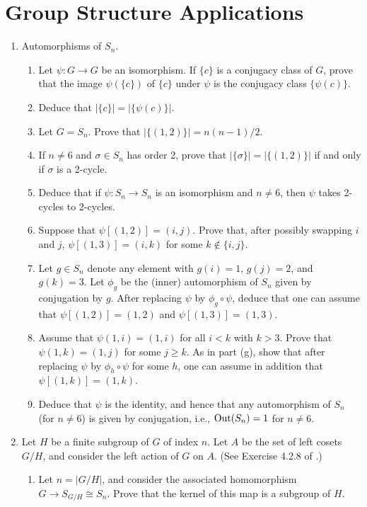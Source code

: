 \documentclass[../psets.tex]{subfiles}
\begin{document}
\section{Group Structure Applications}
\begin{enumerate}
    \item {}Automorphisms of $S_n$.
    \begin{enumerate}
        \item Let $\psi:G\to G$ be an isomorphism. If $\{c\}$ is a conjugacy class of $G$, prove that the image $\psi(\{c\})$ of $\{c\}$ under $\psi$ is the conjugacy class $\{\psi(c)\}$.
        \item Deduce that $|\{c\}|=|\{\psi(c)\}|$.
        \item Let $G=S_n$. Prove that $|\{(1,2)\}|=n(n-1)/2$.
        \item If $n\neq 6$ and $\sigma\in S_n$ has order 2, prove that $|\{\sigma\}|=|\{(1,2)\}|$ if and only if $\sigma$ is a 2-cycle.
        \item Deduce that if $\psi:S_n\to S_n$ is an isomorphism and $n\neq 6$, then $\psi$ takes 2-cycles to 2-cycles.
        \item Suppose that $\psi[(1,2)]=(i,j)$. Prove that, after possibly swapping $i$ and $j$, $\psi[(1,3)]=(i,k)$ for some $k\notin\{i,j\}$.
        \item Let $g\in S_n$ denote any element with $g(i)=1$, $g(j)=2$, and $g(k)=3$. Let $\phi_g$ be the (inner) automorphism of $S_n$ given by conjugation by $g$. After replacing $\psi$ by $\phi_g\circ\psi$, deduce that one can assume that $\psi[(1,2)]=(1,2)$ and $\psi[(1,3)]=(1,3)$.
        \item Assume that $\psi(1,i)=(1,i)$ for all $i<k$ with $k>3$. Prove that $\psi(1,k)=(1,j)$ for some $j\geq k$. As in part (g), show that after replacing $\psi$ by $\phi_h\circ\psi$ for some $h$, one can assume in addition that $\psi[(1,k)]=(1,k)$.
        \item Deduce that $\psi$ is the identity, and hence that any automorphism of $S_n$ (for $n\neq 6$) is given by conjugation, i.e., $\operatorname{Out}(S_n)=1$ for $n\neq 6$.
    \end{enumerate}
    \item Let $H$ be a finite subgroup of $G$ of index $n$. Let $A$ be the set of left cosets $G/H$, and consider the left action of $G$ on $A$. (See Exercise 4.2.8 of \textcite{bib:DummitFoote}.)
    \begin{enumerate}
        \item Let $n=|G/H|$, and consider the associated homomorphism $G\to S_{G/H}\cong S_n$. Prove that the kernel of this map is a subgroup of $H$.

\end{enumerate}
\end{enumerate}
\end{document}

